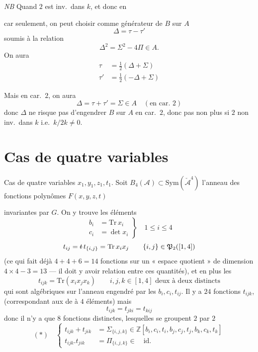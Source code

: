 \documentclass[11pt,a4paper]{article}
\begin{document}
\emph{NB} Quand $2$ est inv.\ dans $k$, et donc en

car seulement, on peut choisir comme générateur de $B$ sur $A$
\[
  \Delta = \tau - \tau'
\]
soumis à la relation
\[
  \Delta^2 = \Sigma^2 - 4\Pi \in A .
\]
On aura
\[
  \begin{aligned}
    \tau &= \tfrac12 (\Delta + \Sigma) \\
    \tau' &= \tfrac12 (-\Delta + \Sigma)
  \end{aligned}
\]

Mais en car.\ $2$, on aura
\[
  \Delta = \tau + \tau' = \Sigma \in A \quad (\text{en car.\ } 2)
\]
donc $\Delta$ ne risque pas d'engendrer $B$ sur $A$ en car.\ $2$,
donc pas non plus si $2$ non inv.\ dans $k$ i.e.\ $k/2k \neq 0$.

\section{Cas de quatre variables}

Cas de quatre variables $x_1, y_1, z_1, t_1$.
Soit $B_4(\mathcal{A}) \subset \mathrm{Sym}(\check{\mathcal{A}}^4)$ l'anneau des
fonctions polynômes $F(x,y,z,t)$

invariantes par $G$. On y trouve les éléments
\[
  \left.
  \begin{aligned}
    b_i &= \mathrm{Tr}\, x_i \\
    c_i &= \det x_i
  \end{aligned}
  \right\} \quad 1 \leq i \leq 4
\]
\[
  t_{ij} = \text{\struck{$t$}}\, t_{\{i,j\}} = \mathrm{Tr}\, x_i x_j
  \qquad \{i,j\} \in \mathfrak{P}_2([1,4])
\]
(ce qui fait déjà $4 + 4 + 6 = 14$ fonctions sur un « espace quotient » de dimension
$4 \times 4 - 3 = 13$ --- il doit y avoir   relation entre ces
quantités), et en plus les
\[
  t_{ijk} = \mathrm{Tr}(x_i x_j x_k)
  \qquad i, j, k \in [1,4] \text{ deux à deux distincts}
\]
qui sont algébriques sur l'anneau engendré par les $b_i, c_i, t_{ij}$.
Il y a $24$ fonctions $t_{ijk}$,  (correspondant aux  de \ill{}
à $4$ éléments) mais
\[
  t_{ijk} = t_{jki} = t_{kij}
\]
donc il n'y a que $8$ fonctions distinctes, lesquelles se groupent $2$ par $2$ 
\[
  (*) \quad
  \left\{
  \begin{aligned}
    t_{ijk} + t_{jik} &= \Sigma_{\{i,j,k\}} \in \mathbb{Z}[b_i, c_i, t_i, b_j, c_j, t_j, b_k, c_k, t_k] \\
    t_{ijk} . t_{jik} &= \Pi_{\{i,j,k\}} \in \quad \text{id.}
  \end{aligned}
  \right.
\]
\end{document}

